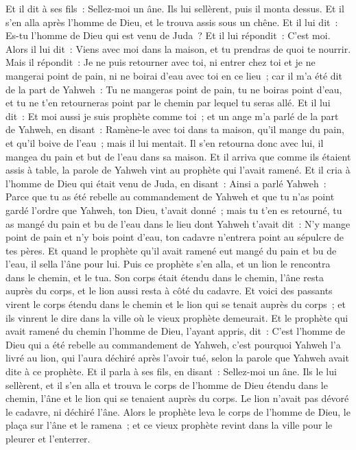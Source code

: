\begin{multicols}{2}
Et il dit à ses fils~: Sellez-moi un âne. Ils lui sellèrent, puis il monta dessus.
Et il s'en alla après l'homme de Dieu, et le trouva assis sous un chêne. Et il lui dit~: Es-tu l'homme de Dieu qui est venu de Juda~? Et il lui répondit~: C'est moi.
Alors il lui dit~: Viens avec moi dans la maison, et tu prendras de quoi te nourrir.
Mais il répondit~: Je ne puis retourner avec toi, ni entrer chez toi et je ne mangerai point de pain, ni ne boirai d'eau avec toi en ce lieu~;
car il m'a été dit de la part de Yahweh~: Tu ne mangeras point de pain, tu ne boiras point d'eau, et tu ne t'en retourneras point par le chemin par lequel tu seras allé.
Et il lui dit~: Et moi aussi je suis prophète comme toi~; et un ange m'a parlé de la part de Yahweh, en disant~: Ramène-le avec toi dans ta maison, qu'il mange du pain, et qu'il boive de l'eau~; mais il lui mentait.
Il s'en retourna donc avec lui, il mangea du pain et but de l'eau dans sa maison.
Et il arriva que comme ils étaient assis à table, la parole de Yahweh vint au prophète qui l'avait ramené.
Et il cria à l'homme de Dieu qui était venu de Juda, en disant~: Ainsi a parlé Yahweh~: Parce que tu as été rebelle au commandement de Yahweh et que tu n'as point gardé l'ordre que Yahweh, ton Dieu, t'avait donné~;
mais tu t'en es retourné, tu as mangé du pain et bu de l'eau dans le lieu dont Yahweh t'avait dit~: N'y mange point de pain et n'y bois point d'eau, ton cadavre n'entrera point au sépulcre de tes pères.
Et quand le prophète qu'il avait ramené eut mangé du pain et bu de l'eau, il sella l'âne pour lui.
Puis ce prophète s'en alla, et un lion le rencontra dans le chemin, et le tua. Son corps était étendu dans le chemin, l'âne resta auprès du corps, et le lion aussi resta à côté du cadavre.
Et voici des passants virent le corps étendu dans le chemin et le lion qui se tenait auprès du corps~; et ils vinrent le dire dans la ville où le vieux prophète demeurait.
Et le prophète qui avait ramené du chemin l'homme de Dieu, l'ayant appris, dit~: C'est l'homme de Dieu qui a été rebelle au commandement de Yahweh, c'est pourquoi Yahweh l'a livré au lion, qui l'aura déchiré après l'avoir tué, selon la parole que Yahweh avait dite à ce prophète.
Et il parla à ses fils, en disant~: Sellez-moi un âne. Ils le lui sellèrent,
et il s'en alla et trouva le corps de l'homme de Dieu étendu dans le chemin, l'âne et le lion qui se tenaient auprès du corps. Le lion n'avait pas dévoré le cadavre, ni déchiré l'âne.
Alors le prophète leva le corps de l'homme de Dieu, le plaça sur l'âne et le ramena~; et ce vieux prophète revint dans la ville pour le pleurer et l'enterrer.

\end{multicols}
